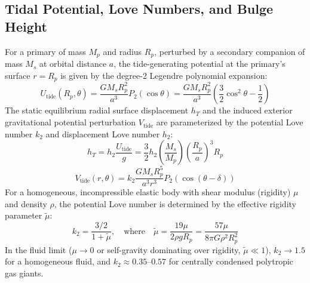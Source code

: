 \documentclass[11pt,a4paper]{article}
\begin{document}
\subsection{Tidal Potential, Love Numbers, and Bulge Height}
For a primary of mass $M_p$ and radius $R_p$, perturbed by a secondary companion of mass $M_s$ at orbital distance $a$, the tide-generating potential at the primary's surface $r = R_p$ is given by the degree-2 Legendre polynomial expansion:
\begin{equation}
U_{\text{tide}}(R_p, \theta) = \frac{G M_s R_p^2}{a^3} P_2(\cos \theta) = \frac{G M_s R_p^2}{a^3} \left( \frac{3}{2}\cos^2 \theta - \frac{1}{2} \right)
\end{equation}
The static equilibrium radial surface displacement $h_T$ and the induced exterior gravitational potential perturbation $V_{\text{tide}}$ are parameterized by the potential Love number $k_2$ and displacement Love number $h_2$:
\begin{equation}
h_T = h_2 \frac{U_{\text{tide}}}{g} = \frac{3}{2} h_2 \left(\frac{M_s}{M_p}\right) \left(\frac{R_p}{a}\right)^3 R_p
\end{equation}
\begin{equation}
V_{\text{tide}}(r, \theta) = k_2 \frac{G M_s R_p^5}{a^3 r^3} P_2(\cos(\theta - \delta))
\end{equation}
For a homogeneous, incompressible elastic body with shear modulus (rigidity) $\mu$ and density $\rho$, the potential Love number is determined by the effective rigidity parameter $\tilde{\mu}$:
\begin{equation}
k_2 = \frac{3/2}{1 + \tilde{\mu}}, \quad \text{where} \quad \tilde{\mu} = \frac{19 \mu}{2 \rho g R_p} = \frac{57 \mu}{8\pi G \rho^2 R_p^2}
\end{equation}
In the fluid limit ($\mu \to 0$ or self-gravity dominating over rigidity, $\tilde{\mu} \ll 1$), $k_2 \to 1.5$ for a homogeneous fluid, and $k_2 \approx 0.35$--$0.57$ for centrally condensed polytropic gas giants.
\end{document}

